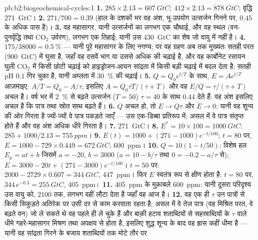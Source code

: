 \begin{solution}{pb:b2:biogeochemical-cycles:1}
\textbf{1.} $285\times 2.13 = \qty{607}{GtC}$; $412\times 2.13 =
\qty{878}{GtC}$; वृद्धि \qty{271}{GtC}।
\textbf{2.} $271/700 = 0.39$ (हाल के दशकों भर वह अंश,
भू-उपयोग उत्सर्जन गिनने पर, $0.45$ के अधिक पास है)।
\textbf{3.} वह महासागर, यानी उत्सर्जनों का लगभग एक चौथाई, और वह स्थल
(वन-पुनर्वृद्धि तथा $\mathrm{CO_2}$ उर्वरण), लगभग एक तिहाई; यानी उस
\qty{430}{GtC} का शेष जो वायु में नहीं है।
\textbf{4.} $175/38000 = \qty{0.5}{\%}$ --- यानी पूरे महासागर के लिए
नगण्य; पर वह ग्रहण अब तक मुख्यतः सतही परत
(\qty{900}{GtC}) में घुसा है, जहाँ वह दसवें भाग या उससे अधिक की चढ़ाई है, और
वह कार्बोनेट रसायन घुली $\mathrm{CO_2}$ में किसी छोटी चढ़ाई को
हाइड्रोजन-आयन सांद्रता में किसी बड़ी चढ़ाई में बदल देता है: सतही pH
$0.1$ गिर चुका है, यानी अम्लता में \qty{30}{\%} की चढ़ाई।
\textbf{5.} $Q = Q_0 e^{t/T}$ के साथ, $E = Ae^{t/T}$ आज़माइए: $A/T = Q_0 -
A/\tau$, इसलिए $A = Q_0\tau T/(\tau + T)$ और वह 
$\dot E/Q = \tau/(\tau + T)$ अचल है। वर्ष भर में
\qty{2}{\%} से बढ़ते उत्सर्जन ($T = 50$) $\tau = 40$ के साथ $0.44$ देते हैं: वह
अंश इसलिए अचल है कि पात्र तथा स्रोत साथ बढ़ते हैं।
\textbf{6.} $Q$ अचल हो, तो $E \to Q\tau$ और $\dot E \to 0$: यानी वह
 शून्य की ओर गिरता है ज्यों-ज्यों वे पात्र पकड़ते जाएँ ---
उस एक-डिब्बा प्रतिरूप में; असल में वे पात्र संतृप्त होते हैं और वह अंश
अधिक धीरे गिरता है।
\textbf{7.} \qty{271}{GtC}।
\textbf{8.} $E^{*} = 10\times 100 = \qty{1000}{GtC}$: $285 +
1000/2.13 = \qty{755}{ppm}$।
\textbf{9.} $E(t) = 1000 + (271 - 1000)e^{-t/100}$; $t = 80$ पर,
$E = 1000 - 729\times 0.449 = \qty{672}{GtC}$: \qty{600}{ppm}।
\textbf{10.} $Q = 10(1 - t/50)$: विशेष हल $E_p = at + b$
जिसमें $a = -20$, $b = 3000$ ($a = 10 - b/\tau$ तथा $0 = -0.2 -
a/\tau$ से); $E = 3000 - 20t + (271 - 3000)e^{-t/100}$। $t = 50$ पर:
$2000 - 2729\times 0.607 = \qty{344}{GtC}$, \qty{447}{ppm}। फिर $E$
स्वतंत्र रूप से क्षीण होता है: $t = 80$ पर, $344\,e^{-0.3} = \qty{255}{GtC}$,
\qty{405}{ppm}।
\textbf{11.} \qty{405}{ppm} के मुक़ाबले \qty{600}{ppm}: यानी दूसरा
परिदृश्य उस वायु को, 2100 तक, लगभग वहीं लौटा देता है जहाँ वह आज है।
\textbf{12.} वह एक ही $\tau$ उन पात्रों से किसी सिकुड़ते अतिरेक पर
उसी दर से काम करवाता रहता है; असल में वे तेज़ पात्र (वह
मिश्रित परत, वे बढ़ते वन) जो ले सकते थे वह पहले ही ले चुके हैं
और बाक़ी हटाव शताब्दियों से सहस्राब्दियों के $\tau$ वाले धीमे गहरे-महासागर मिश्रण तथा
अपक्षय से होता है, इसलिए शुद्ध शून्य के बाद वह ह्रास कहीं धीमा है ---
यानी वह सांद्रता गिरने के बजाय शताब्दियों तक मोटे तौर पर

\end{solution}

